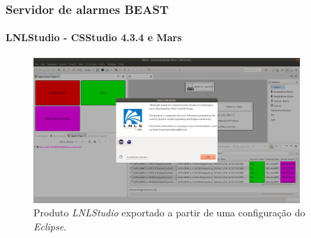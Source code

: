 \begin{frame}
\frametitle{Servidor de alarmes BEAST}
\framesubtitle{LNLStudio - CSStudio 4.3.4 e Mars}
\begin{figure}[h]
\centering
\includegraphics[width=0.90\textwidth]{image/lnlstudio}
\caption {\centering Produto \textit{LNLStudio} exportado a partir de uma
configuração do \textit{Eclipse}.}
\label{fig:lnlstudio}
\end{figure}

\end{frame}
